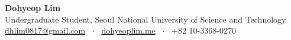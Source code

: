 \begin{center}
  {\Large\bfseries Dohyeop Lim}\\[4pt]
  Undergraduate Student, Seoul National University of Science and Technology\\[2pt]
  {\small
    \href{mailto:dhlim0817@gmail.com}{dhlim0817@gmail.com} ~$\cdot$~
    \href{https://www.dohyeoplim.me/}{dohyeoplim.me} ~$\cdot$~
    +82 10-3368-0270}
\end{center}
